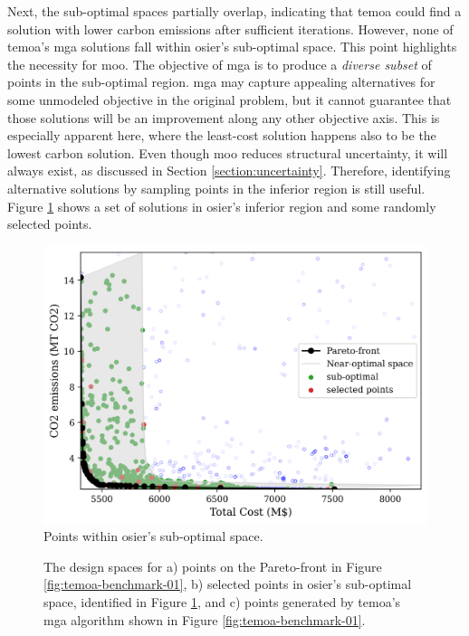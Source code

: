 Next, the sub-optimal spaces partially overlap, indicating that \ac{temoa} could
find a solution with lower carbon emissions after sufficient iterations.
However, none of \ac{temoa}'s \ac{mga} solutions fall within \ac{osier}'s
sub-optimal space. This point highlights the necessity for \acl{moo}. The
objective of \ac{mga} is to produce a \textit{diverse subset} of points in the
sub-optimal region. \ac{mga} may capture appealing alternatives for some
unmodeled objective in the original problem, but it cannot guarantee that those
solutions will be an improvement along any other objective axis. This is
especially apparent here, where the least-cost solution happens also to be the
lowest carbon solution. Even though \ac{moo} reduces structural uncertainty, it
will always exist, as discussed in Section \ref{section:uncertainty}. Therefore,
identifying alternative solutions by sampling points in the inferior region is
still useful. Figure \ref{fig:temoa-benchmark-02} shows a set of solutions in
\ac{osier}'s inferior region and some randomly selected points.



\begin{figure}[h]
  \centering
  \includegraphics[width=0.6\columnwidth]{figures/results/osier_mga_subset_01.png}
  \caption{Points within \ac{osier}'s sub-optimal space.}
  \label{fig:temoa-benchmark-02}
\end{figure}


\begin{figure}[ht!]
  \centering
  \resizebox{\columnwidth}{!}{}
  \caption{The design spaces for a) points on the Pareto-front in Figure
  \ref{fig:temoa-benchmark-01}, b) selected points in \ac{osier}'s sub-optimal
  space, identified in Figure \ref{fig:temoa-benchmark-02}, and c) points
  generated by \ac{temoa}'s \ac{mga} algorithm shown in Figure
  \ref{fig:temoa-benchmark-01}.}
  \label{fig:temoa-benchmark-03}
\end{figure}


